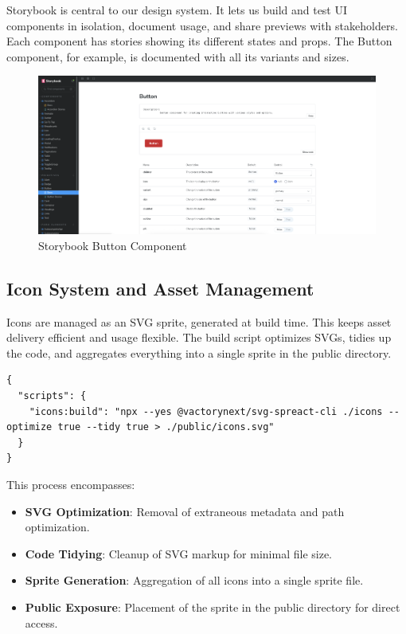 Storybook is central to our design system. It lets us build and test UI components in isolation, document usage, and share previews with stakeholders. Each component has stories showing its different states and props. The Button component, for example, is documented with all its variants and sizes.

\begin{figure}[H]
    \centering
    \includegraphics[width=\textwidth]{images/storybook_button.png}
    \caption{Storybook Button Component}
    \label{fig:storybook_button}
\end{figure}

\subsection{Icon System and Asset Management}

Icons are managed as an SVG sprite, generated at build time. This keeps asset delivery efficient and usage flexible. The build script optimizes SVGs, tidies up the code, and aggregates everything into a single sprite in the public directory.

\begin{lstlisting}[caption={Icon Build Script Configuration}, captionpos=b]
{
  "scripts": {
    "icons:build": "npx --yes @vactorynext/svg-spreact-cli ./icons --optimize true --tidy true > ./public/icons.svg"
  }
}
\end{lstlisting}

This process encompasses:

\begin{itemize}
    \item \textbf{SVG Optimization}: Removal of extraneous metadata and path optimization.
    \item \textbf{Code Tidying}: Cleanup of SVG markup for minimal file size.
    \item \textbf{Sprite Generation}: Aggregation of all icons into a single sprite file.
    \item \textbf{Public Exposure}: Placement of the sprite in the public directory for direct access.
\end{itemize}


